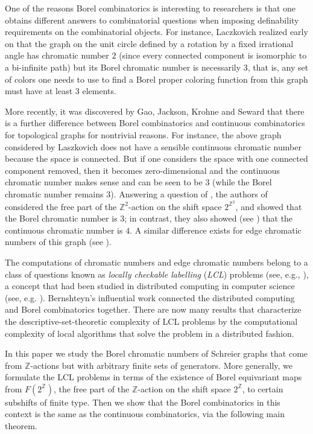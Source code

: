 \documentclass[11pt]{amsart}
\theoremstyle{definition}
\def\Z{\mathbb{Z}}
\def\Z{\mathbb{Z}}
\begin{document}
One of the reasons Borel combinatorics is interesting to researchers is that one obtains different answers to combinatorial questions when imposing definability requirements on the combinatorial objects. For instance, Laczkovich realized early on that the graph on the unit circle defined by a rotation by a fixed irrational angle has chromatic number $2$ (since every connected component is isomorphic to a bi-infinite path) but its Borel chromatic number is necessarily $3$, that is, any set of colors one needs to use to find a Borel proper coloring function from this graph must have at least $3$ elements. 

More recently, it was discovered by Gao, Jackson, Krohne and Seward \cite{GJKS, GJKS2} that there is a further difference between Borel combinatorics and continuous combinatorics for topological graphs for nontrivial reasons. For instance, the above graph considered by Laszkovich does not have a sensible continuous chromatic number because the space is connected. But if one considers the space with one connected component removed, then it becomes zero-dimensional and the continuous chromatic number makes sense and can be seen to be $3$ (while the Borel chromatic number remains $3$). Answering a question of \cite{KST}, the authors of \cite{GJKS2} considered the free part of the $\Z^2$-action on the shift space $2^{\Z^2}$, and showed that the Borel chromatic number is $3$; in contrast, they also showed  (see \cite{GJKS}) that the continuous chromatic number is $4$. A similar difference exists for edge chromatic numbers of this graph (see \cite{BHT, CU, GJKS, GWW, GR, Weil}).

The computations of chromatic numbers and edge chromatic numbers belong to a class of questions known as {\em locally checkable labelling} (\emph{LCL}) problems (see, e.g., \cite{GR, GR2}), a concept that had been studied in distributed computing in computer science (see, e.g. \cite{BHKetc}). Bernshteyn's influential work \cite{Ber} connected the distributed computing and Borel combinatorics together. There are now many results that characterize the descriptive-set-theoretic complexity of LCL problems by the computational complexity of local algorithms that solve the problem in a distributed fashion. 

In this paper we study the Borel chromatic numbers of Schreier graphs that come from $\Z$-actions but with arbitrary finite sets of generators. More generally, we formulate the LCL problems in terms of the existence of Borel equivariant maps from $F(2^\Z)$, the free part of the $\Z$-action on the shift space $2^\Z$, to certain subshifts of finite type. Then we show that the Borel combinatorics in this context is the same as the continuous combinatorics, via the following main theorem.
\end{document}
